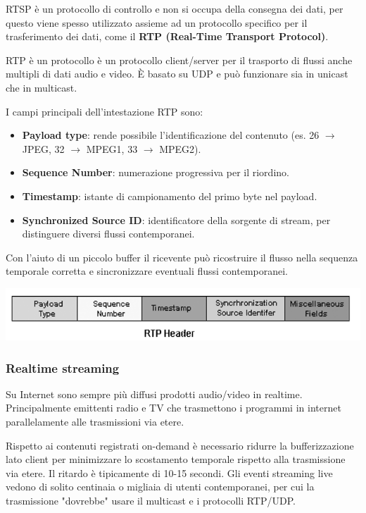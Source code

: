             RTSP è un protocollo di controllo e non si occupa della consegna dei dati, per questo viene spesso utilizzato assieme ad un protocollo specifico per il trasferimento dei dati, come il \textbf{RTP (Real-Time Transport Protocol)}.

            RTP è un protocollo è un protocollo client/server per il trasporto di flussi anche multipli di dati audio e video. È basato su UDP e può funzionare sia in unicast che in multicast.

            I campi principali dell'intestazione RTP sono:
            \begin{itemize}
                \item \textbf{Payload type}: rende possibile l’identificazione del contenuto (es. 26 $\rightarrow$ JPEG, 32 $\rightarrow$ MPEG1, 33 $\rightarrow$ MPEG2).
                \item \textbf{Sequence Number}: numerazione progressiva per il riordino.
                \item \textbf{Timestamp}: istante di campionamento del primo byte nel payload.
                \item \textbf{Synchronized Source ID}: identificatore della sorgente di stream, per distinguere diversi flussi contemporanei.
            \end{itemize}

            Con l'aiuto di un piccolo buffer il ricevente può ricostruire il flusso nella sequenza temporale corretta e sincronizzare eventuali flussi contemporanei.

            \begin{center}
                \includegraphics[scale=0.5]{chapters/6/assets/schema_zc.png}
            \end{center}

        \subsubsection{Realtime streaming}
            Su Internet sono sempre più diffusi prodotti audio/video in realtime. Principalmente emittenti radio e TV che trasmettono i programmi in internet parallelamente alle trasmissioni via etere.
        
            Rispetto ai contenuti registrati on-demand è necessario ridurre la bufferizzazione lato client per minimizzare lo scostamento temporale rispetto alla trasmissione via etere. Il ritardo è tipicamente di 10-15 secondi. Gli eventi streaming live vedono di solito centinaia o migliaia di utenti contemporanei, per cui la trasmissione "dovrebbe" usare il multicast e i protocolli RTP/UDP.
        
